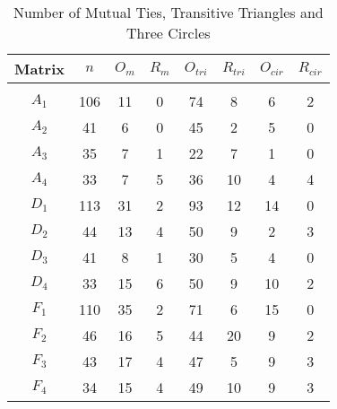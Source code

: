\documentclass[11pt]{article}
\begin{document}
\begin{table}[ht]
\caption{Number of Mutual Ties, Transitive Triangles and Three Circles}
\centering
\begin{tabular}{c|c|cc|cc|cc}
\\[-1.8ex] \hline\hline
Matrix & $n$ & $O_m$ & $R_m$ & $O_{tri}$ & $R_{tri}$ & $O_{cir}$  &$R_{cir}$\\
\hline \\[-1.8ex] 

$A_1$ & 106 & 11 & 0 & 74 & 8 & 6 & 2\\
$A_2$ & 41 & 6 & 0 & 45 & 2 & 5 & 0\\
$A_3$ & 35 & 7 & 1 & 22 & 7 &1 &0\\
$A_4$ & 33 & 7 & 5 & 36 & 10 & 4 &4\\

$D_1$ & 113 & 31 & 2 & 93 & 12 & 14 & 0\\
$D_2$ & 44 & 13 & 4 & 50 & 9 & 2 & 3\\
$D_3$ & 41 & 8 & 1 & 30 & 5 & 4 & 0\\
$D_4$ & 33 & 15 & 6 & 50 & 9 & 10 & 2\\

$F_1$ & 110 & 35 & 2 & 71 & 6 & 15 &0\\
$F_2$ & 46 & 16 & 5 & 44 & 20 & 9 &2\\
$F_3$ & 43 & 17 &4 & 47 & 5 & 9 &3\\
$F_4$ & 34 & 15 & 4& 49 & 10 & 9 &3\\

\hline
\end{tabular}
\end{table}






\unboldmath
\end{document}
